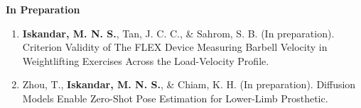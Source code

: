 \documentclass[../main.tex]{subfiles}
\begin{document}
            
        
        \textbf{In Preparation}
        \def\labelprefix{P}
        \begin{enumerate}
            
            \item\label{article: fyp}{\textbf{Iskandar, M. N. S.}, Tan, J. C. C., \& Sahrom, S. B. (In preparation). Criterion Validity of The FLEX Device Measuring Barbell Velocity in Weightlifting Exercises Across the Load-Velocity Profile.}
            
            \item\label{article: diffusion_openpose}{Zhou, T., \textbf{Iskandar, M. N. S.}, \& Chiam, K. H. (In preparation). Diffusion Models Enable Zero-Shot Pose Estimation for Lower-Limb Prosthetic.}
        \end{enumerate}
        
  \resumeSubHeadingListEnd
\end{document}
